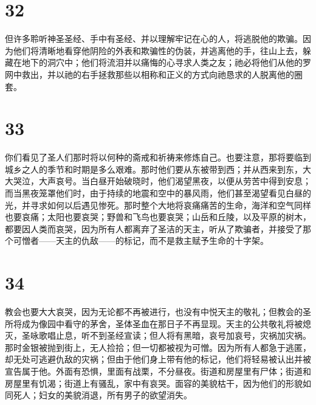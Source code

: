 
\section{32}

但许多聆听神圣圣经、手中有圣经、并以理解牢记在心的人，将逃脱他的欺骗。因为他们将清晰地看穿他阴险的外表和欺骗性的伪装，并逃离他的手，往山上去，躲藏在地下的洞穴中；他们将流泪并以痛悔的心寻求人类之友；祂必将他们从他的罗网中救出，并以祂的右手拯救那些以相称和正义的方式向祂恳求的人脱离他的圈套。\par


\section{33}

你们看见了圣人们那时将以何种的斋戒和祈祷来修炼自己。也要注意，那将要临到城乡之人的季节和时期是多么艰难。那时他们要从东被带到西；并从西来到东，大大哭泣，大声哀号。当白昼开始破晓时，他们渴望黑夜，以便从劳苦中得到安息；而当黑夜笼罩他们时，由于持续的地震和空中的暴风雨，他们甚至渴望看见白昼的光，并寻求如何以后遇见惨死。那时整个大地将哀痛痛苦的生命，海洋和空气同样也要哀痛；太阳也要哀哭；野兽和飞鸟也要哀哭；山岳和丘陵，以及平原的树木，都要因人类而哀哭，因为所有人都离弃了圣洁的天主，听从了欺骗者，并接受了那个可憎者——天主的仇敌——的标记，而不是救主赋予生命的十字架。\par


\section{34}

教会也要大大哀哭，因为无论都不再被进行，也没有中悦天主的敬礼；但教会的圣所将成为像园中看守的茅舍，圣体圣血在那日子不再显现。天主的公共敬礼将被熄灭，圣咏歌唱止息，听不到圣经宣读；但人将有黑暗，哀号加哀号，灾祸加灾祸。那时金银被抛到街上，无人捡拾；但一切都被视为可憎。因为所有人都急于逃匿，却无处可逃避仇敌的灾祸；但由于他们身上带有他的标记，他们将轻易被认出并被宣告属于他。外面有恐惧，里面有战栗，不分昼夜。街道和房屋里有尸体；街道和房屋里有饥渴；街道上有骚乱，家中有哀哭。面容的美貌枯干，因为他们的形貌如同死人；妇女的美貌消退，所有男子的欲望消失。\par

